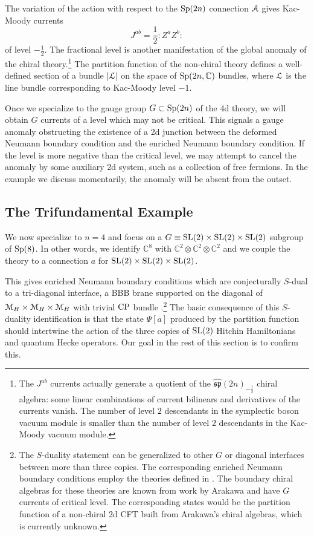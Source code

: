 \documentclass[11pt,a4paper]{article}
\begin{document}
The variation of the action with respect to the ${\mathrm{Sp}}(2n)$ connection ${\cal A}$ gives Kac-Moody currents
\begin{equation}
J^{ab} = \frac12 :Z^a Z^b:
\end{equation}
of level $- \frac12$. The fractional level is another manifestation of the global anomaly of the chiral theory.\footnote{The $J^{ab}$ currents actually generate a quotient of the $\widehat{\mathfrak{sp}}(2n)_{-\frac12}$ chiral algebra: some linear combinations of current bilinears and derivatives of the currents vanish. The number of level $2$ descendants in the symplectic boson vacuum module is smaller than the number of level $2$ descendants in the Kac-Moody vacuum module. } The partition function of the non-chiral theory defines a well-defined section of a bundle $|{\cal L}|$ on the space of ${\mathrm{Sp}}(2n,{\mathbb C})$ bundles, where ${\cal L}$ is the line bundle corresponding to Kac-Moody level $-1$. 

Once we specialize to the gauge group $G \subset {\mathrm{Sp}}(2n)$ of  the 4d theory,  
we will obtain $G$ currents of a level which may not be critical. This signals a gauge anomaly obstructing the 
existence of a 2d junction between the deformed Neumann boundary condition and the enriched Neumann boundary condition. If the level is more negative than the critical level, we may attempt to cancel the anomaly by 
some auxiliary 2d system, such as a collection of free fermions. In the example we discuss momentarily, the anomaly will be absent from the outset. 

\subsection{The Trifundamental Example}\label{tri}

We now specialize to $n=4$ and focus on a $G\equiv {\mathrm{SL}}(2) \times {\mathrm{SL}}(2)\times {\mathrm{SL}}(2)$ subgroup of ${\mathrm{Sp}}(8)$.
In other words, we identify $\mathbb{C}^8$ with $\mathbb{C}^2 \otimes\mathbb{C}^2 \otimes\mathbb{C}^2$
and we couple the theory to a connection $a$ for ${\mathrm{SL}}(2) \times {\mathrm{SL}}(2)\times {\mathrm{SL}}(2)$.

This gives enriched Neumann boundary conditions which are conjecturally $S$-dual to a tri-diagonal interface, a BBB brane supported on the 
diagonal of ${\mathcal M}_H \times {\mathcal M}_H \times {\mathcal M}_H$ with trivial ${\mathrm{CP}}$ bundle \cite{Gaiotto:2016hvd,Benini:2010uu}.\footnote{The $S$-duality statement can be generalized to other $G$ or diagonal interfaces between more than three copies. The corresponding enriched Neumann boundary conditions employ the theories defined in \cite{Benini:2010uu}. The boundary chiral algebras for these theories are known from work by Arakawa \cite{Arakawa:2018egx} and have $G$ currents of critical level. The corresponding states would be the partition function of a non-chiral 2d CFT built from Arakawa's chiral algebras, which is currently unknown.} The basic consequence of this $S$-duality identification is that the state $\Psi[a]$ produced by the partition function should intertwine the action of the three copies of ${\mathrm{SL}}(2)$ Hitchin Hamiltonians and quantum Hecke operators. Our goal in the rest of this section is to confirm this.
 
\end{document}
